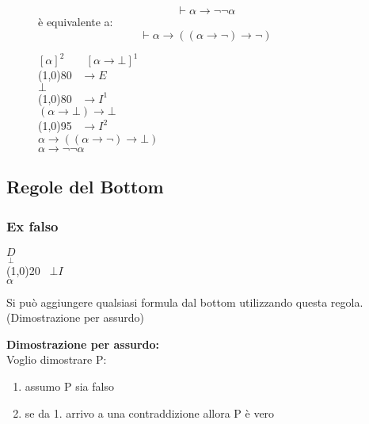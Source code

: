 \documentclass{article}
\theoremstyle{break}
\theoremstyle{break}
\theoremstyle{break}
\theoremstyle{break}
\begin{document}
\begin{figure}[H]
    \begin{example}
        \[
            \vdash \alpha \to \neg \neg \alpha 
        \] 
        è equivalente a:
        \[
            \vdash \alpha \to ((\alpha \to \neg) \to \neg)
        \] 
        \begin{center}
            \( [\alpha]^2 \;\;\;\;\;\;\; [\alpha \to  \bot]^1 \) \\
            \hspace{1cm}\line(1,0){80}\(\;\;\; \to E\)\\
            \( \bot\) \\
            \hspace{1cm}\line(1,0){80}\(\;\;\; \to I^1 \)\\
            \( (\alpha \to \bot) \to \bot\) \\
            \hspace{1cm}\line(1,0){95}\(\;\;\; \to I^2 \)\\
            \( \alpha \to ((\alpha \to \neg) \to \bot) \) \\
            \( \alpha \to \neg \neg \alpha \) 
        \end{center}
    \end{example}
\end{figure}

\subsection{Regole del Bottom}
\subsubsection{Ex falso}
\begin{center}
    \(
        \underset{\bot}{D}
    \)\\ 
        \hspace{0.8cm}\line(1,0){20}\(\;\;\; \bot I \)\\  
    \(
        \alpha
    \)
\end{center}
Si può aggiungere qualsiasi formula dal bottom utilizzando questa regola. (Dimostrazione per assurdo)

\vspace{0.5cm}
\textbf{Dimostrazione per assurdo:}\\
Voglio dimostrare P:
\begin{enumerate}
    \item assumo P sia falso
    \item se da 1. arrivo a una contraddizione allora P è vero
\end{enumerate}
\end{document}

